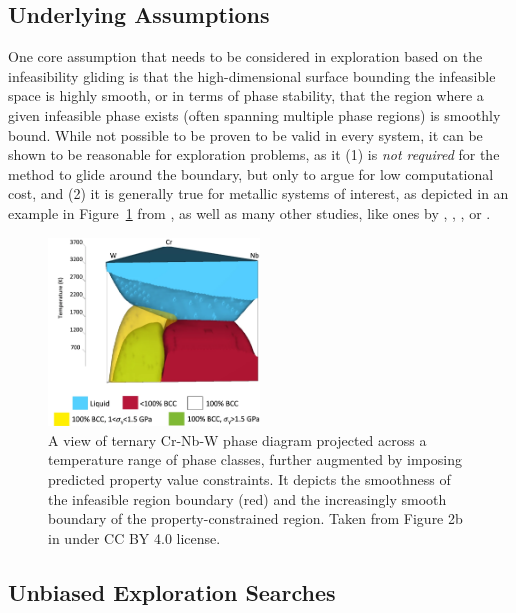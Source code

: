 \subsection{Underlying Assumptions} \label{infglide:ssec:assumptions}

One core assumption that needs to be considered in exploration based on the infeasibility gliding is that the high-dimensional surface bounding the infeasible space is highly smooth, or in terms of phase stability, that the region where a given infeasible phase exists (often spanning multiple phase regions) is smoothly bound. While not possible to be proven to be valid in every system, it can be shown to be reasonable for exploration problems, as it (1) is \emph{not required} for the method to glide around the boundary, but only to argue for low computational cost, and (2) it is generally true for metallic systems of interest, as depicted in an example in Figure~\ref{infeasibilitygliding:fig:katesphasemap} from \citet{Elder2023ComputationalValidation}, as well as many other studies, like ones by \citet{Bobbio2022DesignCompositions}, \citet{Sun2024MaterialsMap:Ag-Al-Cu}, \citet{Gao2016SenaryHfNbTaTiVZr}, or \citet{Zhao2014ExperimentalSystem}.

\begin{figure}[H]
    \centering
    \includegraphics[width=0.5\textwidth]{infeasibilitygliding/PhaseTernaryMap_Elder2023.png}
    \caption{A view of ternary Cr-Nb-W phase diagram projected across a temperature range of phase classes, further augmented by imposing predicted property value constraints. It depicts the smoothness of the infeasible region boundary (red) and the increasingly smooth boundary of the property-constrained region. Taken from Figure 2b in \citet{Elder2023ComputationalValidation} under CC BY 4.0 license.}
    \label{infeasibilitygliding:fig:katesphasemap}
\end{figure}


\subsection{Unbiased Exploration Searches} \label{infglide:ssec:unbiasedexplore}

